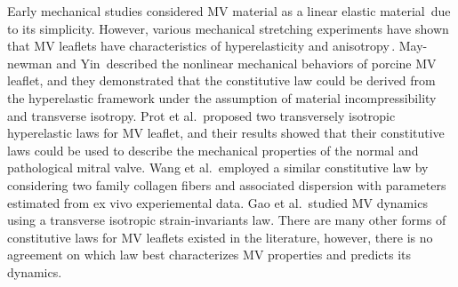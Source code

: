 \documentclass[fleqn,10pt]{wlscirep}
\begin{document}


Early mechanical studies considered  MV material as a linear elastic material\,\cite{Salgo2002Effect,Watton2008Effect,Luo2014MV} due to its simplicity. However, various mechanical stretching experiments  have shown that MV leaflets have  characteristics of hyperelasticity and anisotropy\,\cite{Prot2006An,Prot2009Nonlinear,Prot2010On,May1995Biaxial,Sacks2003Incorporation,Rabbah2013Mechanics}. May-newman and Yin\,\cite{May1998A} described the nonlinear mechanical behaviors of porcine MV leaflet, and they demonstrated that the constitutive law could be derived from the hyperelastic framework under the assumption of material incompressibility and transverse isotropy. Prot et al.\,\cite{Prot2009Finite} proposed two transversely isotropic hyperelastic laws for MV leaflet, and their results showed that their constitutive laws could be used to describe the mechanical properties of the normal and pathological mitral valve.  Wang et al.\,\cite{Wang2012Patient} employed a similar constitutive law by considering two family collagen fibers and associated dispersion with parameters estimated from ex vivo experiemental data. Gao et al.\,\cite{Hao2014A,Gao2017A} studied  MV dynamics using a  transverse isotropic strain-invariants  law. There are many other forms of constitutive laws for MV leaflets existed in the literature, however, there is no agreement on which law best characterizes MV properties and predicts its dynamics. 
\end{document}
